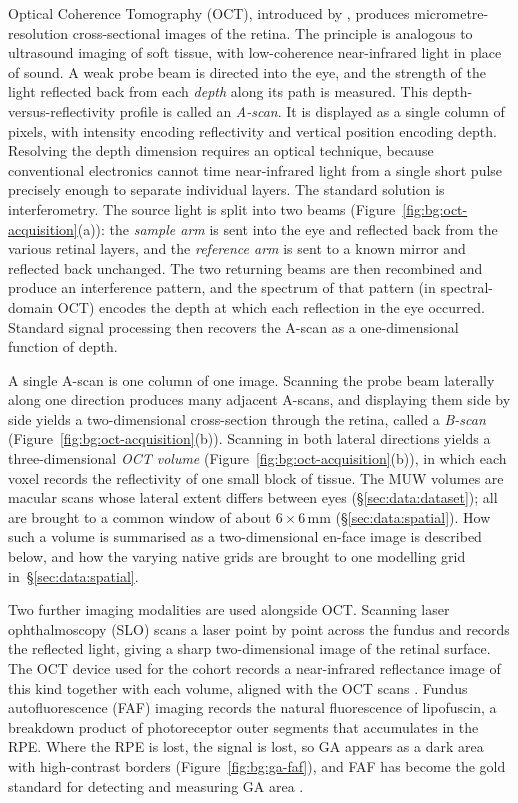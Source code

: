 Optical Coherence Tomography (OCT), introduced by \citet{Huang1991},
produces micrometre-resolution cross-sectional images of the retina.
The principle is analogous to ultrasound imaging of soft tissue, with
low-coherence near-infrared light in place of sound. A weak probe beam is
directed into the eye, and the strength of the light reflected back from
each \emph{depth} along its path is measured. This depth-versus-reflectivity
profile is called an \emph{A-scan}. It is displayed as a single column of
pixels, with intensity encoding reflectivity and vertical position
encoding depth. Resolving the depth dimension requires an optical
technique, because conventional electronics cannot time near-infrared
light from a single short pulse precisely enough to separate individual
layers. The standard solution is interferometry. The source light is
split into two beams (Figure~\ref{fig:bg:oct-acquisition}(a)): the
\emph{sample arm} is sent into the eye and reflected back from the
various retinal layers, and the \emph{reference arm} is sent to a known
mirror and reflected back unchanged. The two returning beams are then recombined and produce an
interference pattern, and the spectrum of that pattern (in
spectral-domain OCT) encodes the depth at which each reflection in
the eye occurred. Standard signal processing then recovers the
A-scan as a one-dimensional function of depth.

A single A-scan is one column of one image. Scanning the probe beam
laterally along one direction produces many adjacent A-scans, and
displaying them side by side yields a two-dimensional cross-section
through the retina, called a \emph{B-scan}
(Figure~\ref{fig:bg:oct-acquisition}(b)). Scanning in both lateral
directions yields a three-dimensional \emph{OCT volume}
(Figure~\ref{fig:bg:oct-acquisition}(b)), in which each voxel records
the reflectivity of one small block of tissue. The MUW volumes are
macular scans whose lateral extent differs between eyes
(\S\ref{sec:data:dataset}); all are brought to a common window of about
$6 \times 6$\,mm (\S\ref{sec:data:spatial}). How such a volume is summarised as a
two-dimensional en-face image is described below, and how the varying
native grids are brought to one modelling grid in~\S\ref{sec:data:spatial}.

Two further imaging modalities are used alongside OCT. Scanning laser
ophthalmoscopy (SLO) scans a laser point by point across the fundus and
records the reflected light, giving a sharp two-dimensional image of the
retinal surface.
The OCT device used for the cohort records a near-infrared reflectance
image of this kind together with each volume, aligned with the OCT scans
\citep{Mai2024}. Fundus autofluorescence (FAF) imaging records the
natural fluorescence of lipofuscin, a breakdown product of photoreceptor
outer segments that accumulates in the RPE. Where the RPE is lost, the
signal is lost, so GA appears as a dark area with high-contrast borders
(Figure~\ref{fig:bg:ga-faf}),
and FAF has become the gold standard for detecting and measuring GA area
\citep{Boopathiraj2024}.

